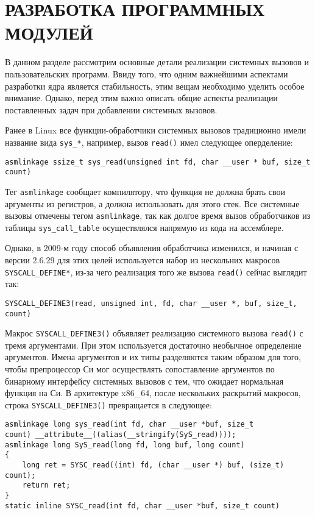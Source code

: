 \pagebreak
\section{РАЗРАБОТКА ПРОГРАММНЫХ МОДУЛЕЙ}
\label{sec:dev}

В данном разделе рассмотрим основные детали реализации системных вызовов и
пользовательских программ. Ввиду того, что одним важнейшими аспектами разработки
ядра является стабильность, этим вещам необходимо уделить особое внимание.
Однако, перед этим важно описать общие аспекты реализации поставленных задач при
добавлении системных вызовов.

Ранее в Linux все функции-обработчики системных вызовов традиционно имели
название вида \texttt{sys\_*}, например, вызов \texttt{read()} имел следующее
оперделение:
\medskip
\begin{lstlisting}[style=cstyle]
asmlinkage ssize_t sys_read(unsigned int fd, char __user * buf, size_t count)
\end{lstlisting}
\medskip

Тег \texttt{asmlinkage} сообщает компилятору, что функция не должна брать свои
аргументы из регистров, а должна использовать для этого стек. Все системные
вызовы отмечены тегом \texttt{asmlinkage}, так как долгое время вызов
обработчиков из таблицы \texttt{sys\_call\_table} осуществлялся напрямую из кода
на ассемблере.

Однако, в 2009-м году способ объявления обработчика изменился, и начиная с
версии 2.6.29 для этих целей используется набор из нескольних макросов
\texttt{SYSCALL\_DEFINE*}, из-за чего реализация того же вызова \texttt{read()}
сейчас выглядит так:
\medskip
\begin{lstlisting}[style=cstyle]
SYSCALL_DEFINE3(read, unsigned int, fd, char __user *, buf, size_t, count)
\end{lstlisting}
\medskip

Макрос \texttt{SYSCALL\_DEFINE3()} объявляет реализацию системного вызова
\texttt{read()} с тремя аргументами. При этом используется достаточно необычное
определение аргументов. Имена аргументов и их типы разделяются таким образом для
того, чтобы препроцессор Си мог осуществлять сопоставление аргументов по
бинарному интерфейсу системных вызовов с тем, что ожидает нормальная функция на
Си. В архитектуре x86\_64, после нескольких раскрытий макросов, строка
\texttt{SYSCALL\_DEFINE3()} превращается в следующее:
\medskip
\begin{lstlisting}[style=cstyle]
asmlinkage long sys_read(int fd, char __user *buf, size_t
count) __attribute__((alias(__stringify(SyS_read))));
asmlinkage long SyS_read(long fd, long buf, long count)
{
	long ret = SYSC_read((int) fd, (char __user *) buf, (size_t) count);
	return ret;
}
static inline SYSC_read(int fd, char __user *buf, size_t count)
\end{lstlisting}
\medskip

